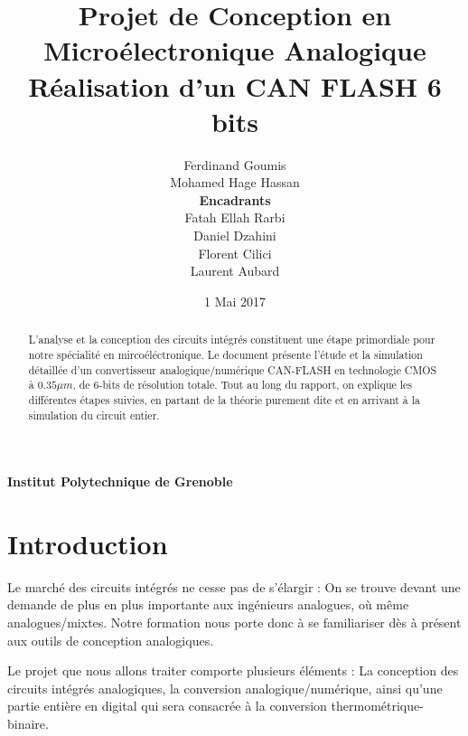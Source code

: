 \documentclass[11pt]{article}
\begin{document}
\title{\textbf{Projet de Conception en Micro\'electronique Analogique} \\ R\'ealisation d'un CAN FLASH 6 bits}
\author{Ferdinand Goumis \\ Mohamed Hage Hassan \medskip\\\medskip \textbf{Encadrants} \medskip \\ Fatah Ellah Rarbi \\ Daniel Dzahini \\ Florent Cilici \\ Laurent Aubard}
\date{1 Mai 2017}
\maketitle
\thispagestyle{empty}

\renewcommand{\abstractname}{Pr\'emabule}

\begin{abstract}
L'analyse et la conception des circuits int\'egr\'es constituent une \'etape primordiale pour notre sp\'ecialit\'e en mirco\'el\'ectronique. Le document pr\'esente l'\'etude et la simulation d\'etaill\'ee d'un convertisseur analogique/num\'erique CAN-FLASH en technologie CMOS \`a $0.35 \mu m$, de 6-bits de r\'esolution totale. Tout au long du rapport, on explique les diff\'erentes \'etapes suivies, en partant de la th\'eorie purement dite et en arrivant \`a la simulation du circuit entier.
  
\end{abstract}

\vskip 9.5cm
\begin{center} \textbf{Institut Polytechnique de Grenoble} \end{center}

\clearpage

\tableofcontents
\clearpage

\section{Introduction}

Le march\'e des circuits int\'egr\'es ne cesse pas de s'\'elargir : On se trouve devant une demande de plus en plus importante aux ing\'enieurs analogues, o\`u m\^eme analogues/mixtes. Notre formation nous porte donc \`a se familiariser d\`es \`a pr\'esent aux outils de conception analogiques. 

Le projet que nous allons traiter comporte plusieurs \'el\'ements : La conception des circuits int\'egr\'es analogiques, la conversion analogique/num\'erique, ainsi qu'une partie enti\`ere en digital qui sera consacr\'ee \`a la conversion thermom\'etrique-binaire.
\end{document}
